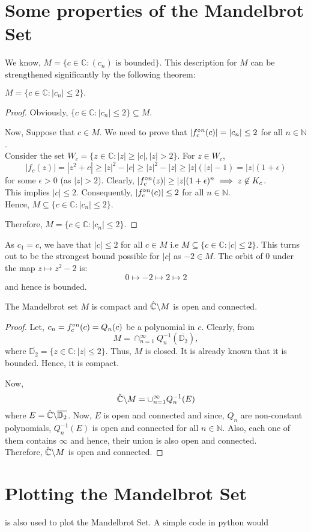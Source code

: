 \section{Some properties of the Mandelbrot Set}
We know, \( M=\{c\in \mathbb{C}:(c_n)\text{ is bounded}\} \). 
This description for \( M \) can be strengthened significantly by the following theorem:
\begin{theorem}\label{thm4.1}
	\( M=\{c\in \mathbb{C}:|c_n|\le 2 \}.\)
\end{theorem}
\begin{proof}Obviously, \( \{c\in \mathbb{C}:|c_n|\le 2\}  \subseteq M\).

	Now, Suppose that \( c\in M \). We need to prove that \( |\fcof[n](c)|=|c_n|\le 2 \) for all \( n\in \mathbb{N} \).\\
	Consider the set \( W_c=\{z\in \mathbb{C}:|z|\ge |c|,|z|>2\} \). For \( z\in W_c \),\[
		|f_c(z)|=|z^2+c|\ge |z|^2-|c|\ge |z|^2-|z|\ge |z|(|z|-1)=|z|(1+\epsilon)
	\] for some \( \epsilon>0 \) (as \( |z|>2 \)). Clearly, \( |\fcof[n](z)|\ge |z|(1+\epsilon)^n \implies z\not\in K_c\).\\
	This implies \( |c|\le 2 \). Consequently, \( |\fcof[n](c)|\le 2 \) for all \( n\in \mathbb{N} \).\\
	Hence, \( M\subseteq  \{c\in \mathbb{C}:|c_n|\le 2 \} \).

	Therefore, \( M=\{c\in \mathbb{C}:|c_n|\le 2\} \).
\end{proof}

As \( c_1=c \), we have that \( |c|\le 2 \) for all \( c\in M \) i.e \( M \subseteq \{c\in \mathbb{C}:|c|\le 2\} \). 
This turns out to be the strongest bound possible for \( |c| \)
as \( -2\in M \). The orbit of \( 0 \) under the map \( z\mapsto z^2-2 \) is: \[ 0\mapsto -2\mapsto 2\mapsto 2 \]
and hence is bounded.

\begin{theorem}
	The Mandelbrot set \( M \) is compact and \( \hat{\mathbb{C}}\backslash M \) is open and connected.
\end{theorem}
\begin{proof}
	Let, \( c_n=\fcof[n](c)=Q_n(c) \) be a polynomial in \( c \). Clearly, from  \[
		M=\cap_{n=1}^{\infty}Q_n^{-1}(\overline{\mathbb{D}_2}),
	\] where \( \overline{\mathbb{D}_2}=\{z\in \mathbb{C}:|z|\le 2\} \).
	Thus, \( M \) is closed. It is already known that it is bounded. Hence, it is compact.

	Now, \[
		\hat{\mathbb{C}}\backslash M=\cup_{n=1}^\infty Q_n^{-1}(E)
	\] where \( E=\hat{\mathbb{C}}\backslash\overline{\mathbb{D}_2}\). Now, \( E \) is open and connected and 
	since, \( Q_n \) are non-constant polynomials, \( Q_n^{-1}(E) \) is open and connected for all \( n\in \mathbb{N} \).
	Also, each one of them contains \( \infty \) and hence, their union is also open and connected.\\
	Therefore, \( \hat{\mathbb{C}}\backslash M \) is open and connected.

\end{proof}

\section{Plotting the Mandelbrot Set}
 is also used to plot the Mandelbrot Set. A simple code in python would
